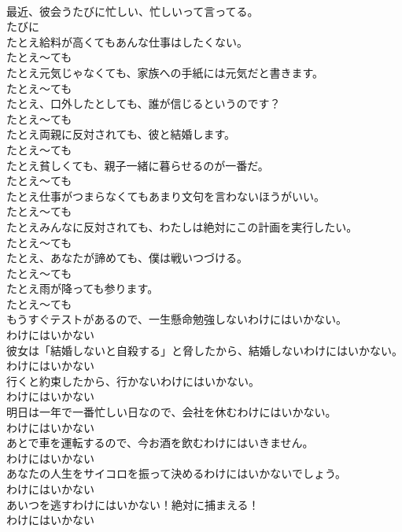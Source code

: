 \documentclass[8pt]{extreport}
\begin{document}
\begin{CJK}{UTF8}{min}
\\	最近、彼会うたびに忙しい、忙しいって言ってる。	
\\	たびに
\\	たとえ給料が高くてもあんな仕事はしたくない。	
\\	たとえ～ても
\\	たとえ元気じゃなくても、家族への手紙には元気だと書きます。	
\\	たとえ～ても
\\	たとえ、口外したとしても、誰が信じるというのです？	
\\	たとえ～ても
\\	たとえ両親に反対されても、彼と結婚します。	
\\	たとえ～ても
\\	たとえ貧しくても、親子一緒に暮らせるのが一番だ。	
\\	たとえ～ても
\\	たとえ仕事がつまらなくてもあまり文句を言わないほうがいい。	
\\	たとえ～ても
\\	たとえみんなに反対されても、わたしは絶対にこの計画を実行したい。	
\\	たとえ～ても
\\	たとえ、あなたが諦めても、僕は戦いつづける。	
\\	たとえ～ても
\\	たとえ雨が降っても参ります。	
\\	たとえ～ても
\\	もうすぐテストがあるので、一生懸命勉強しないわけにはいかない。	
\\	わけにはいかない
\\	彼女は「結婚しないと自殺する」と脅したから、結婚しないわけにはいかない。	
\\	わけにはいかない
\\	行くと約束したから、行かないわけにはいかない。	
\\	わけにはいかない
\\	明日は一年で一番忙しい日なので、会社を休むわけにはいかない。	
\\	わけにはいかない
\\	あとで車を運転するので、今お酒を飲むわけにはいきません。	
\\	わけにはいかない
\\	あなたの人生をサイコロを振って決めるわけにはいかないでしょう。	
\\	わけにはいかない
\\	あいつを逃すわけにはいかない！絶対に捕まえる！	
\\	わけにはいかない

\end{CJK}
\end{document}
